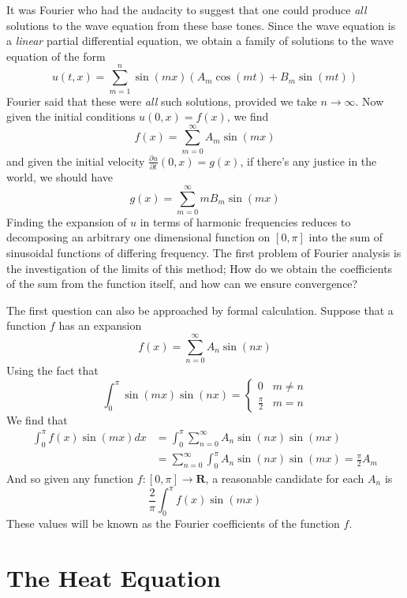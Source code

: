 It was Fourier who had the audacity to suggest that one could produce {\it all} solutions to the wave equation from these base tones. Since the wave equation is a {\it linear} partial differential equation, we obtain a family of solutions to the wave equation of the form
%
\[ u(t,x) = \sum_{m = 1}^n \sin(mx) (A_m \cos(mt) + B_m \sin(mt)) \]
%
Fourier said that these were {\it all} such solutions, provided we take $n \to \infty$. Now given the initial conditions $u(0,x) = f(x)$, we find
%
\[ f(x) = \sum_{m = 0}^\infty A_m \sin(mx) \]
%
and given the initial velocity $\frac{\partial u}{\partial t}(0,x) = g(x)$, if there's any justice in the world, we should have
%
\[ g(x) = \sum_{m = 0}^\infty m B_m \sin(mx) \]
%
Finding the expansion of $u$ in terms of harmonic frequencies reduces to decomposing an arbitrary one dimensional function on $[0,\pi]$ into the sum of sinusoidal functions of differing frequency. The first problem of Fourier analysis is the investigation of the limits of this method; How do we obtain the coefficients of the sum from the function itself, and how can we ensure convergence?

The first question can also be approached by formal calculation. Suppose that a function $f$ has an expansion
%
\[ f(x) = \sum_{n = 0}^\infty A_n \sin(nx) \]
%
Using the fact that
%
\[ \int_0^\pi \sin(mx) \sin(nx) = \begin{cases} 0 & m \neq n \\ \frac{\pi}{2} & m = n \end{cases} \]
%
We find that
%
\begin{align*}
    \int_0^\pi f(x) \sin(mx) dx &= \int_0^\pi \sum_{n = 0}^\infty A_n \sin(nx) \sin(mx)\\
    &= \sum_{n = 0}^\infty \int_0^\pi A_n \sin(nx) \sin(mx) = \frac{\pi}{2} A_m
\end{align*}
%
And so given any function $f:[0,\pi] \to \mathbf{R}$, a reasonable candidate for each $A_n$ is
%
\[ \frac{2}{\pi} \int_0^\pi f(x) \sin(mx) \]
%
These values will be known as the Fourier coefficients of the function $f$.

\section{The Heat Equation}

